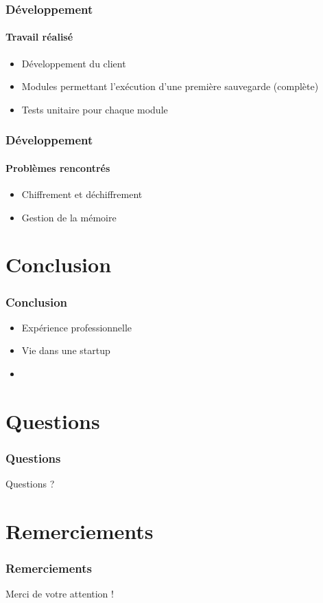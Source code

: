 \documentclass{beamer}
\begin{document}
\begin{frame}
 \frametitle{D\'eveloppement}
 \framesubtitle{Travail r\'ealis\'e}
 \begin{itemize}
  \item D\'eveloppement du client
  \item Modules permettant l'ex\'ecution d'une premi\`ere sauvegarde
  (compl\`ete)
  \item Tests unitaire pour chaque module
 \end{itemize}
\end{frame}

\begin{frame}
 \frametitle{D\'eveloppement}
 \framesubtitle{Probl\`emes rencontr\'es}
 \begin{itemize}
  \item Chiffrement et d\'echiffrement
  \item Gestion de la m\'emoire
 \end{itemize}
\end{frame}

\section{Conclusion}
\begin{frame}
 \frametitle{Conclusion}
 \begin{itemize}
  \item Expérience professionnelle 
  \item Vie dans une startup
  \item 	
 \end{itemize}
\end{frame}


\section*{Questions}
\begin{frame}
\frametitle{Questions}
Questions ?
\end{frame}

\section*{Remerciements}
\begin{frame}
 \frametitle{Remerciements}
 Merci de votre attention !
\end{frame}
\end{document}
